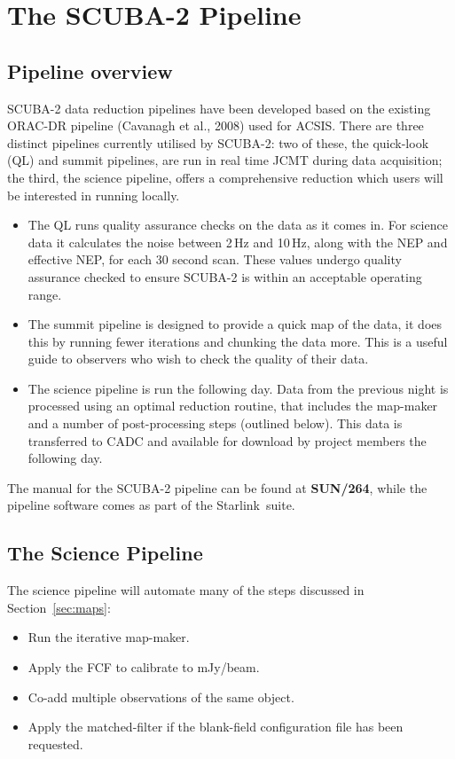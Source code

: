 \documentclass[twoside,11pt]{article}
\newcommand{\htmladdnormallink}[2]{#1}
\newcommand{\xref}[3]{#1}
\newcommand{\xlabel}[1]{}
\renewcommand{\_}{\texttt{\symbol{95}}}
\newcommand{\starlink}{\htmladdnormallink{Starlink}{http://starlink.jach.hawaii.edu}}
\newcommand{\pipelinesun}{\xref{\textbf{SUN/264}}{sun264}{}}
\begin{document}
\clearpage
\section{\xlabel{pipeline}The SCUBA-2 Pipeline}
\label{sec:pipe}
\subsection{\xlabel{pl_overview}Pipeline overview}

SCUBA-2 data reduction pipelines have been developed based on the
existing ORAC-DR pipeline (Cavanagh et al., 2008\cite{oracdr}) used
for ACSIS. There are three distinct pipelines currently utilised by
SCUBA-2: two of these, the quick-look (QL) and summit pipelines, are
run in real time JCMT during data acquisition; the third, the science
pipeline, offers a comprehensive reduction which users will be
interested in running locally.

\begin{itemize}
\item The QL runs quality assurance checks on the data as it comes in.
For science data it calculates the noise between 2\,Hz and 10\,Hz,
along with the NEP and effective NEP, for each 30 second scan. These
values undergo quality assurance checked to ensure SCUBA-2 is within
an acceptable operating range.
\item The summit pipeline is designed to provide a quick map of the
data, it does this by running fewer iterations and chunking the data
more. This is a useful guide to observers who wish to check the
quality of their data.
\item The science pipeline is run the following day. Data from the
previous night is processed using an optimal reduction routine, that
includes the map-maker and a number of post-processing steps (outlined
below).  This data is transferred to CADC and available for download
by project members the following day.
\end{itemize}

The manual for the SCUBA-2 pipeline can be found at \pipelinesun,
while the pipeline software comes as part of the \starlink\ suite.


\subsection{\xlabel{science_pl}The Science Pipeline}
The science pipeline will automate many of the steps discussed in
Section~\ref{sec:maps}:
\vspace{-0.3cm}
\begin{itemize}\itemsep-0.3em
\item Run the iterative map-maker.
\item Apply the FCF to calibrate to mJy/beam.
\item Co-add multiple observations of the same object.
\item Apply the matched-filter if the blank-field configuration file
      has been requested.
\end{itemize}
\end{document}
